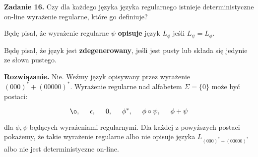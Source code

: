 \documentclass[a4paper]{article}
\begin{document}
\textbf{Zadanie 16.} Czy dla każdego języka języka regularnego istnieje deterministyczne on-line wyrażenie regularne, które go definiuje?
\vspace{1cm}

Będę pisał, że wyrażenie regularne $\psi$ \textbf{opisuje} język $L_{\phi}$ jeśli $L_{\psi} = L_{\phi}$.

Będę pisał, że język jest \textbf{zdegenerowany}, jeśli jest pusty lub składa się jedynie ze słowa pustego.
\vspace{1cm}

\textbf{Rozwiązanie.} Nie. Weźmy język opisywany przez wyrażenie $(000)^* + (00000)^*$. Wyrażenie regularne nad alfabetem $\Sigma = \{ 0 \}$ może być postaci:

$$ \o,\hspace{5mm} \epsilon,\hspace{5mm} 0,\hspace{5mm} \phi^*,\hspace{5mm} \phi \circ \psi,\hspace{5mm} \phi + \psi$$

dla $\phi, \psi$ będących wyrażeniami regularnymi. Dla każdej z powyższych postaci pokażemy, że takie wyrażenie regularne albo nie opisuje języka $L_{(000)^* + (00000)^*}$ albo nie jest deterministyczne on-line.
\end{document}
